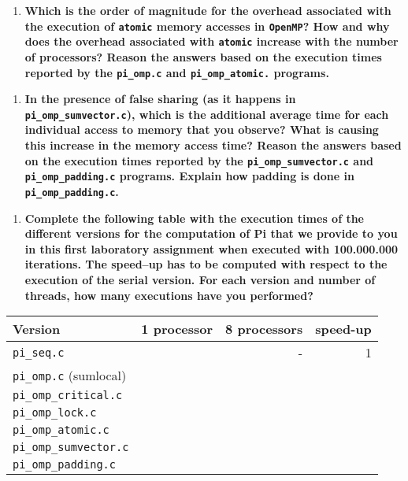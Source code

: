 \documentclass[a4paper]{article}
\begin{document}
\begin{enumerate}[resume]
	\item \textbf{Which is the order of magnitude for the overhead associated with the execution of \texttt{atomic} memory accesses in \texttt{OpenMP}? How and why does the overhead associated with \texttt{atomic} increase with the number of processors? Reason the answers based on the execution times reported by the \texttt{pi\_omp.c} and \texttt{pi\_omp\_atomic.} programs.}
\end{enumerate}

\begin{enumerate}[resume]
	\item \textbf{In the presence of false sharing (as it happens in \texttt{pi\_omp\_sumvector.c}), which is the additional average time for each individual access to memory that you observe? What is causing this increase in the memory access time? Reason the answers based on the execution times reported by the \texttt{pi\_omp\_sumvector.c} and \texttt{pi\_omp\_padding.c} programs. Explain how padding is done in \texttt{pi\_omp\_padding.c}.}
\end{enumerate}

\begin{enumerate}[resume]
	\item \textbf{ Complete the following table with the execution times of the different versions for the computation of Pi that we provide to you in this first laboratory assignment when executed with 100.000.000 iterations. The speed–up has to be computed with respect to the execution of the serial version. For each version and number of threads, how many executions have you performed? }
\end{enumerate}

\begin{table}[H]
	\centering
	\begin{tabular}{l|rrr}
		\textbf{Version} & \textbf{1 processor} & \textbf{8 processors} & \textbf{speed-up} \\
		\hline
		\verb|pi_seq.c| & & - & 1 \\
		\verb|pi_omp.c| (sumlocal) & & & \\
		\verb|pi_omp_critical.c| & & & \\
		\verb|pi_omp_lock.c| & & & \\
		\verb|pi_omp_atomic.c|  & & & \\
		\verb|pi_omp_sumvector.c| & & & \\
		\verb|pi_omp_padding.c| & & & \\
	\end{tabular}
\end{table}
\end{document}
